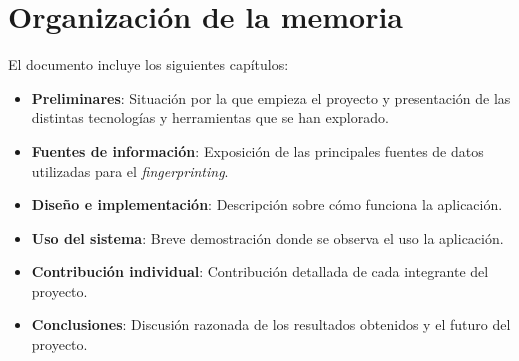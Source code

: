 \section{Organización de la memoria}
El documento incluye los siguientes capítulos:
\begin{itemize}
	\item \textbf{Preliminares}: Situación por la que empieza el proyecto y presentación de las distintas tecnologías y herramientas que se han explorado.
	\item \textbf{Fuentes de información}: Exposición de las principales fuentes de datos utilizadas para el \textit{fingerprinting}.
	\item \textbf{Diseño e implementación}: Descripción sobre cómo funciona la aplicación.
	\item \textbf{Uso del sistema}: Breve demostración donde se observa el uso la aplicación.
	\item \textbf{Contribución individual}: Contribución detallada de cada integrante del proyecto.
	\item \textbf{Conclusiones}: Discusión razonada de los resultados obtenidos y el futuro del proyecto.
\end{itemize}
